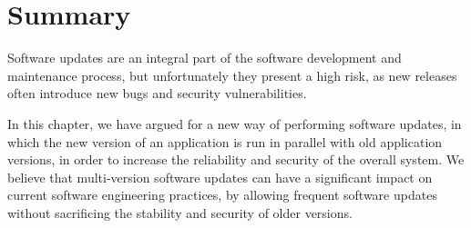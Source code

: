 \section{Summary}
\label{multi-version:summary}

Software updates are an integral part of the software development and
maintenance process, but unfortunately they present a high risk, as new
releases often introduce new bugs and security vulnerabilities.

In this chapter, we have argued for a new way of performing software updates,
in which the new version of an application is run in parallel with old
application versions, in order to increase the reliability and security of the
overall system. We believe that multi-version software updates can have a
significant impact on current software engineering practices, by allowing
frequent software updates without sacrificing the stability and security of
older versions.
